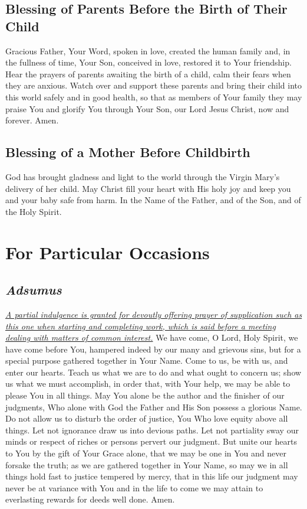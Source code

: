 \documentclass[12pt]{article}
\newcommand{\prayersection}[1]{\section{#1}}
\newcommand{\prayertitle}[1]{\subsection{#1}}
\newcommand{\indulgencedprayertitle}[1]{\prayertitle{#1 \protect\kreuz}}
\newcommand{\emphasis}[1]{\emph{#1}}
\newcommand{\emphasis}[1]{\textsl{#1}}
\newcommand{\foreign}[1]{\emphasis{#1}}
\newcommand{\note}[1]{{\small{\emphasis{#1}}}\newline}
\newcommand{\linkednote}[2]{\hyperlink{#1}{\note{#2}}}
\begin{document}
\prayertitle{Blessing of Parents Before the Birth of Their Child}
\label{prayer:parents_before_birth_of_child}
Gracious Father, Your Word, spoken in love, created the human family and, in the fullness of time, Your Son, conceived in love, restored it to Your friendship.
Hear the prayers of parents awaiting the birth of a child, calm their fears when they are anxious.
Watch over and support these parents and bring their child into this world safely and in good health, so that as members of Your family they may praise You and glorify You through Your Son, our Lord Jesus Christ, now and forever.
Amen.

\prayertitle{Blessing of a Mother Before Childbirth}
\label{prayer:mother_before_childbirth}
God has brought gladness and light to the world through the Virgin Mary's delivery of her child.
May Christ fill your heart with His holy joy and keep you and your baby safe from harm. 
In the Name of the Father, and of the Son, and of the Holy Spirit.

\newpage


\prayersection{For Particular Occasions}
\indulgencedprayertitle{\foreign{Adsumus}}
\linkednote{grant26}{A partial indulgence is granted for devoutly offering prayer of supplication such as this one when starting and completing work, which is said before a meeting dealing with matters of common interest.}
We have come, O Lord, Holy Spirit, we have come before You, hampered indeed by our many and grievous sins, but for a special purpose gathered together in Your Name.
Come to us, be with us, and enter our hearts.
Teach us what we are to do and what ought to concern us;
show us what we must accomplish, in order that, with Your help, we may be able to please You in all things.
May You alone be the author and the finisher of our judgments, Who alone with God the Father and His Son possess a glorious Name.
Do not allow us to disturb the order of justice, You Who love equity above all things.
Let not ignorance draw us into devious paths.
Let not partiality sway our minds or respect of riches or persons pervert our judgment.
But unite our hearts to You by the gift of Your Grace alone, that we may be one in You and never forsake the truth;
as we are gathered together in Your Name, so may we in all things hold fast to justice tempered by mercy, that in this life our judgment may never be at variance with You and in the life to come we may attain to everlasting rewards for deeds well done.
Amen.
\end{document}
